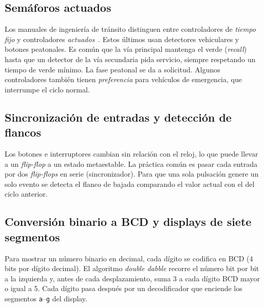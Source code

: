 \documentclass[12pt,letterpaper]{article}
\begin{document}
\subsection{Semáforos actuados}
Los manuales de ingeniería de tránsito distinguen entre controladores de \emph{tiempo fijo} y
controladores \emph{actuados}~\cite{fhwa}. Estos últimos usan detectores vehiculares y botones
peatonales. Es común que la vía principal mantenga el verde (\emph{recall}) hasta que un detector
de la vía secundaria pida servicio, siempre respetando un tiempo de verde mínimo. La fase
peatonal se da a solicitud. Algunos controladores también tienen \emph{preferencia} para
vehículos de emergencia, que interrumpe el ciclo normal.

\subsection{Sincronización de entradas y detección de flancos}
Los botones e interruptores cambian sin relación con el reloj, lo que puede llevar a un
\emph{flip-flop} a un estado metaestable. La práctica común es pasar cada entrada por dos
\emph{flip-flops} en serie (sincronizador). Para que una sola pulsación genere un solo evento se
detecta el flanco de bajada comparando el valor actual con el del ciclo anterior.

\subsection{Conversión binario a BCD y displays de siete segmentos}
Para mostrar un número binario en decimal, cada dígito se codifica en BCD (4 bits por dígito
decimal). El algoritmo \emph{double dabble} recorre el número bit por bit a la izquierda y,
antes de cada desplazamiento, suma 3 a cada dígito BCD mayor o igual a 5. Cada dígito pasa
después por un decodificador que enciende los segmentos \texttt{a}--\texttt{g} del display.

\end{document}
